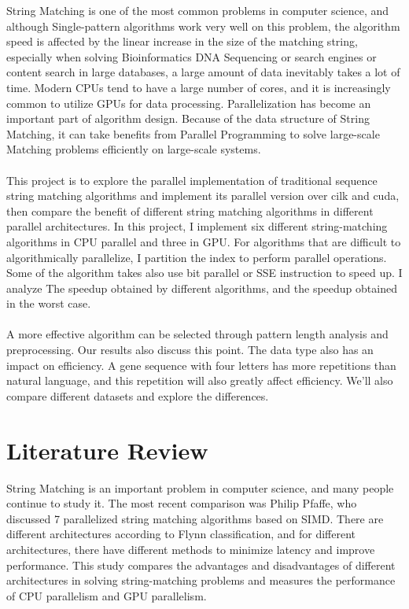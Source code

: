 \documentclass[11pt]{article}       %
\begin{document}
String Matching is one of the most common problems in computer science, and although Single-pattern algorithms work very well on this problem, the algorithm speed is affected by the linear increase in the size of the matching string, especially when solving Bioinformatics DNA Sequencing or search engines or content search in large databases, a large amount of data inevitably takes a lot of time. Modern CPUs tend to have a large number of cores, and it is increasingly common to utilize GPUs for data processing. Parallelization has become an important part of algorithm design. Because of the data structure of String Matching, it can take benefits  from Parallel Programming to solve large-scale Matching problems efficiently on large-scale systems.\\
\\This project is to explore the parallel implementation of traditional sequence string matching algorithms and implement its parallel version over cilk and cuda, then compare the benefit of different string matching algorithms in different parallel architectures. In this project, I implement six different string-matching algorithms in CPU parallel and three in GPU. For algorithms that are difficult to algorithmically parallelize, I partition the index to perform parallel operations. Some of the algorithm takes also use bit parallel or SSE instruction to speed up. I analyze The speedup obtained by different algorithms, and the speedup obtained in the worst case.\\ 
\\A more effective algorithm can be selected through pattern length analysis and preprocessing. Our results also discuss this point. The data type also has an impact on efficiency. A gene sequence with four letters has more repetitions than natural language, and this repetition will also greatly affect efficiency. We'll also compare different datasets and explore the differences.\\




\section{Literature Review} \label{litrev}

String Matching is an important problem in computer science, and many people continue to study it. The most recent comparison was Philip Pfaffe, who discussed 7 parallelized string matching algorithms based on SIMD\cite{Matching}. There are different architectures according to Flynn classification, and for different architectures, there have different methods to minimize latency and improve performance. This study compares the advantages and disadvantages of different architectures in solving string-matching problems and measures the performance of CPU parallelism and GPU parallelism. \\
\end{document}
